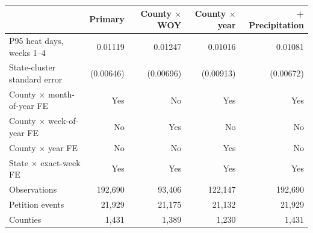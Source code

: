 \begin{tabular}{lrrrr}
\toprule
 & Primary & County $\times$ WOY & County $\times$ year & + Precipitation \\
\midrule
P95 heat days, weeks 1--4 & 0.01119 & 0.01247 & 0.01016 & 0.01081 \\
State-cluster standard error & (0.00646) & (0.00696) & (0.00913) & (0.00672) \\
County $\times$ month-of-year FE & Yes & No & Yes & Yes \\
County $\times$ week-of-year FE & No & Yes & No & No \\
County $\times$ year FE & No & No & Yes & No \\
State $\times$ exact-week FE & Yes & Yes & Yes & Yes \\
Observations & 192,690 & 93,406 & 122,147 & 192,690 \\
Petition events & 21,929 & 21,175 & 21,132 & 21,929 \\
Counties & 1,431 & 1,389 & 1,230 & 1,431 \\
\bottomrule
\end{tabular}
